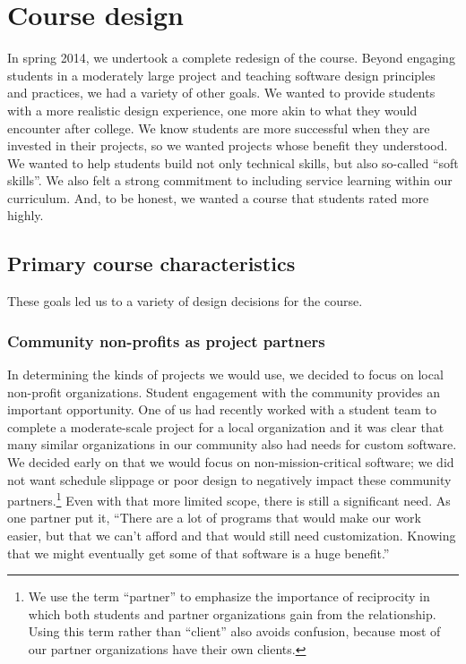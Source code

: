\section{Course design}


In spring 2014, we undertook a complete redesign of the course.
Beyond engaging students in a moderately large project and teaching
software design principles and practices, we had a variety of other
goals.  We wanted to provide students with a more realistic design
experience, one more akin to what they would encounter after college.
We know students are more successful when they are invested in their
projects, so we wanted projects whose benefit they understood.  We
wanted to help students build not only technical skills, but also
so-called ``soft skills''.  We also felt a strong commitment to
including service learning within our curriculum.  And, to be
honest, we wanted a course that students rated more highly.

\subsection{Primary course characteristics}

These goals led us to a variety of design decisions for the course.

\subsubsection{Community non-profits as project partners}

In determining the kinds of projects we would use, we decided to
focus on local non-profit organizations.  Student engagement with
the community provides an important opportunity.  One of us had
recently worked with a student team to complete a moderate-scale
project for a local organization and it was clear that many similar
organizations in our community also had needs for custom software.
We decided early on that we would focus on non-mission-critical
software; we did not want schedule slippage or poor design to
negatively impact these community partners.\footnote{We use the term ``partner'' to emphasize the importance of
reciprocity in which both students and partner organizations gain
from the relationship.  Using this term rather than ``client'' also
avoids confusion, because most of our partner organizations have
their own clients.} Even with that more limited scope, there is
still a significant need.  As one partner put it, ``There are a lot
of programs that would make our work easier, but that we can't
afford and that would still need customization.  Knowing that we
might eventually get some of that software is a huge benefit.''

